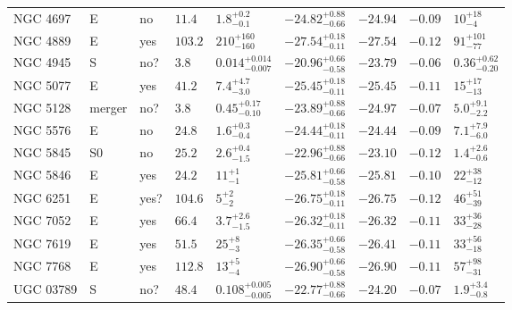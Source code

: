 \begin{table*}
\begin{center}
\begin{tabular}{lllllllll}
NGC 4697  &  E  &  no   &  $11.4$  &  $1.8_{-0.1}^{+0.2}$   &  $-24.82_{-0.66}^{+0.88}$   &  $-24.94$   &  $-0.09$  &  $10_{-4}^{+18}$   \\ 
NGC 4889  &  E  &  yes   &  $103.2$  &  $210_{-160}^{+160}$   &  $-27.54_{-0.11}^{+0.18}$   &  $-27.54$   &  $-0.12$  &  $91_{-77}^{+101}$   \\ 
NGC 4945  &  S  &  no?  &  $3.8$  &  $0.014_{-0.007}^{+0.014}$   &  $-20.96_{-0.58}^{+0.66}$   &  $-23.79$   &  $-0.06$  &  $0.36_{-0.20}^{+0.62}$   \\ 
NGC 5077  &  E  &  yes   &  $41.2$  &  $7.4_{-3.0}^{+4.7}$   &  $-25.45_{-0.11}^{+0.18}$   &  $-25.45$   &  $-0.11$  &  $15_{-13}^{+17}$   \\ 
NGC 5128  &  merger  &  no?  &  $3.8$  &  $0.45_{-0.10}^{+0.17}$   &  $-23.89_{-0.66}^{+0.88}$   &  $-24.97$   &  $-0.07$  &  $5.0_{-2.2}^{+9.1}$   \\ 
NGC 5576  &  E  &  no   &  $24.8$  &  $1.6_{-0.4}^{+0.3}$   &  $-24.44_{-0.11}^{+0.18}$   &  $-24.44$   &  $-0.09$  &  $7.1_{-6.0}^{+7.9}$   \\ 
NGC 5845  &  S0  &  no   &  $25.2$  &  $2.6_{-1.5}^{+0.4}$   &  $-22.96_{-0.66}^{+0.88}$   &  $-23.10$   &  $-0.12$  &  $1.4_{-0.6}^{+2.6}$   \\ 
NGC 5846  &  E  &  yes   &  $24.2$  &  $11_{-1}^{+1}$   &  $-25.81_{-0.58}^{+0.66}$   &  $-25.81$   &  $-0.10$  &  $22_{-12}^{+38}$   \\ 
NGC 6251  &  E  &  yes?  &  $104.6$  &  $5_{-2}^{+2}$   &  $-26.75_{-0.11}^{+0.18}$   &  $-26.75$   &  $-0.12$  &  $46_{-39}^{+51}$   \\ 
NGC 7052  &  E  &  yes   &  $66.4$  &  $3.7_{-1.5}^{+2.6}$   &  $-26.32_{-0.11}^{+0.18}$   &  $-26.32$   &  $-0.11$  &  $33_{-28}^{+36}$   \\ 
NGC 7619  &  E  &  yes   &  $51.5$  &  $25_{-3}^{+8}$   &  $-26.35_{-0.58}^{+0.66}$   &  $-26.41$   &  $-0.11$  &  $33_{-18}^{+56}$   \\ 
NGC 7768  &  E  &  yes   &  $112.8$  &  $13_{-4}^{+5}$   &  $-26.90_{-0.58}^{+0.66}$   &  $-26.90$   &  $-0.11$  &  $57_{-31}^{+98}$   \\ 
UGC 03789  &  S  &  no?  &  $48.4$  &  $0.108_{-0.005}^{+0.005}$   &  $-22.77_{-0.66}^{+0.88}$   &  $-24.20$   &  $-0.07$  &  $1.9_{-0.8}^{+3.4}$   \\ 
\hline         
\end{tabular}   
\end{center}    
\end{table*}    

